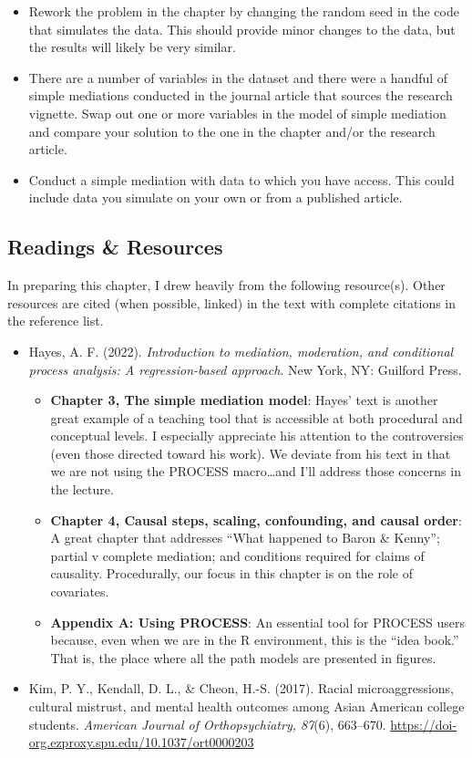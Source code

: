 \documentclass[
  11pt,
]{book}
\providecommand{\tightlist}{%
  \setlength{\itemsep}{0pt}\setlength{\parskip}{0pt}}
\begin{document}
\begin{itemize}
\tightlist
\item
  Rework the problem in the chapter by changing the random seed in the code that simulates the data. This should provide minor changes to the data, but the results will likely be very similar.
\item
  There are a number of variables in the dataset and there were a handful of simple mediations conducted in the journal article that sources the research vignette. Swap out one or more variables in the model of simple mediation and compare your solution to the one in the chapter and/or the research article.
\item
  Conduct a simple mediation with data to which you have access. This could include data you simulate on your own or from a published article.
\end{itemize}

\hypertarget{readings-resources-4}{%
\subsection{Readings \& Resources}\label{readings-resources-4}}

In preparing this chapter, I drew heavily from the following resource(s). Other resources are cited (when possible, linked) in the text with complete citations in the reference list.

\begin{itemize}
\tightlist
\item
  Hayes, A. F. (2022). \emph{Introduction to mediation, moderation, and conditional process analysis: A regression-based approach}. New York, NY: Guilford Press.

  \begin{itemize}
  \tightlist
  \item
    \textbf{Chapter 3, The simple mediation model}: Hayes' text is another great example of a teaching tool that is accessible at both procedural and conceptual levels. I especially appreciate his attention to the controversies (even those directed toward his work). We deviate from his text in that we are not using the PROCESS macro\ldots and I'll address those concerns in the lecture.
  \item
    \textbf{Chapter 4, Causal steps, scaling, confounding, and causal order}: A great chapter that addresses ``What happened to Baron \& Kenny''; partial v complete mediation; and conditions required for claims of causality. Procedurally, our focus in this chapter is on the role of covariates.
  \item
    \textbf{Appendix A: Using PROCESS}: An essential tool for PROCESS users because, even when we are in the R environment, this is the ``idea book.'' That is, the place where all the path models are presented in figures.
  \end{itemize}
\item
  Kim, P. Y., Kendall, D. L., \& Cheon, H.-S. (2017). Racial microaggressions, cultural mistrust, and mental health outcomes among Asian American college students. \emph{American Journal of Orthopsychiatry, 87}(6), 663--670. \url{https://doi-org.ezproxy.spu.edu/10.1037/ort0000203}
\end{itemize}
\end{document}
